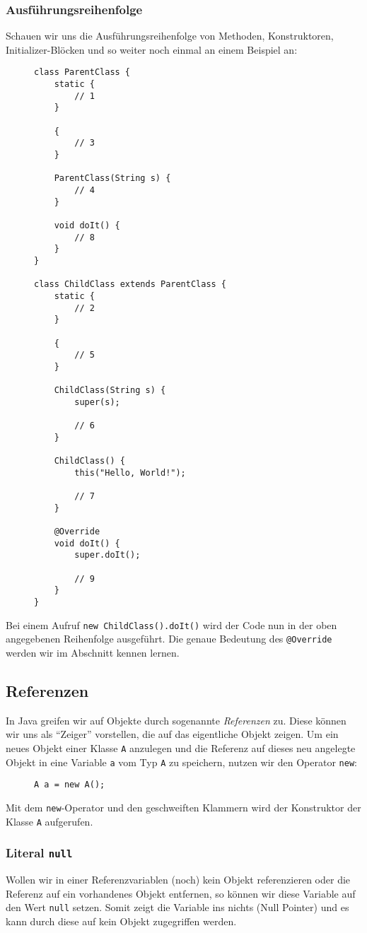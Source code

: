 	\subsubsection{Ausführungsreihenfolge}
		Schauen wir uns die Ausführungsreihenfolge von Methoden, Konstruktoren, Initializer-Blöcken und so weiter noch einmal an einem Beispiel an:
		\begin{figure}[H]
			\centering
			\begin{lstlisting}
class ParentClass {
	static {
		// 1
	}
	
	{
		// 3
	}
	
	ParentClass(String s) {
		// 4
	}
	
	void doIt() {
		// 8
	}
}

class ChildClass extends ParentClass {
	static {
		// 2
	}
	
	{
		// 5
	}
	
	ChildClass(String s) {
		super(s);
		
		// 6
	}
	
	ChildClass() {
		this("Hello, World!");
		
		// 7
	}
	
	@Override
	void doIt() {
		super.doIt();
		
		// 9
	}
}
\end{lstlisting}
		\end{figure}
		Bei einem Aufruf \lstinline|new ChildClass().doIt()| wird der Code nun in der oben angegebenen Reihenfolge ausgeführt. Die genaue Bedeutung des \lstinline|@Override| werden wir im Abschnitt  kennen lernen.

\subsection{Referenzen}
	In Java greifen wir auf Objekte durch sogenannte \textit{Referenzen} zu. Diese können wir uns als \enquote{Zeiger} vorstellen, die auf das eigentliche Objekt zeigen. Um ein neues Objekt einer Klasse \lstinline|A| anzulegen und die Referenz auf dieses neu angelegte Objekt in eine Variable \lstinline|a| vom Typ \lstinline|A| zu speichern, nutzen wir den Operator \lstinline|new|:
	\begin{figure}[H]
		\centering
		\lstinline|A a = new A();|
	\end{figure}
	Mit dem \lstinline|new|-Operator und den geschweiften Klammern wird der Konstruktor der Klasse \lstinline|A| aufgerufen.
	
	\subsubsection{Literal \texttt{null}}
		Wollen wir in einer Referenzvariablen (noch) kein Objekt referenzieren oder die Referenz auf ein vorhandenes Objekt entfernen, so können wir diese Variable auf den Wert \lstinline|null| setzen. Somit zeigt die Variable ins nichts (Null Pointer) und es kann durch diese auf kein Objekt zugegriffen werden.
		
